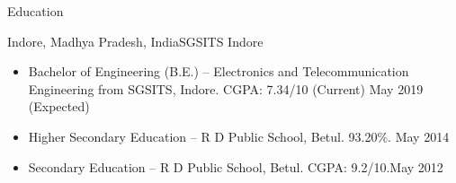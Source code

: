 \documentclass[]{mcdowellcv}
\begin{document}
	\makeheader

	\begin{cvsection}{Education}
		\begin{cvsubsection}{Indore, Madhya Pradesh, India}{SGSITS Indore}{}
			\begin{itemize}
				\item Bachelor of Engineering (B.E.) -- Electronics and Telecommunication Engineering from SGSITS, Indore.     CGPA: 7.34/10 (Current) \hfill May 2019 (Expected)
				\item Higher Secondary Education -- R D Public School, Betul. 93.20\%. \hfill May 2014
				\item Secondary Education -- R D Public School, Betul. CGPA: 9.2/10.\hfill May 2012
			\end{itemize}
		\end{cvsubsection}
	\end{cvsection}
\end{document}
